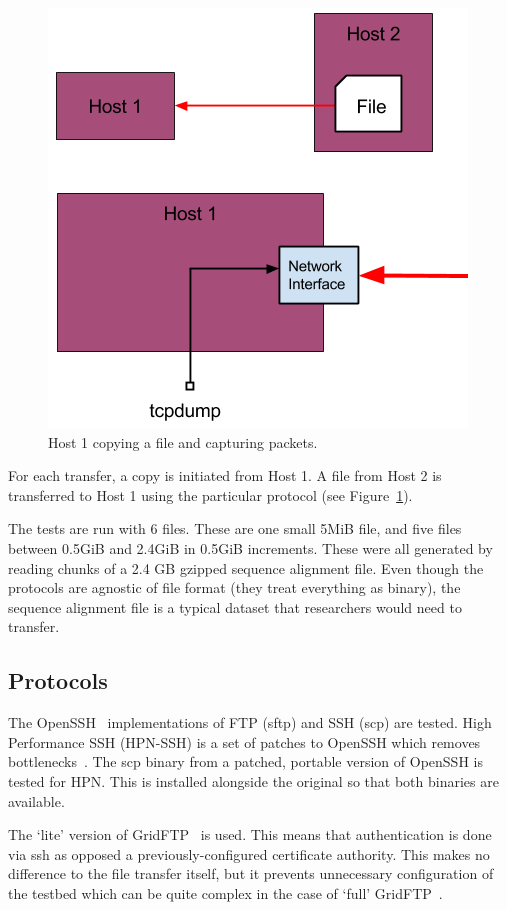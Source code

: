 \documentclass{sig-alternate-05-2015}
\begin{document}
\begin{figure}[t]
\centering
	\includegraphics[width=.6\linewidth]{img/transfer_example.png}
\caption{Host 1 copying a file and capturing packets.\label{fig:copy_example}}
\end{figure}
For each transfer, a copy is initiated from Host 1. A file from Host 2 is transferred to Host 1 using the particular protocol (see Figure~\ref{fig:copy_example}).

The tests are run with 6 files. These are one small 5MiB file, and five files between 0.5GiB and 2.4GiB in 0.5GiB increments. These were all generated by reading chunks of a 2.4 GB gzipped sequence alignment file. Even though the protocols are agnostic of file format (they treat everything as binary), the sequence alignment file is a typical dataset that researchers would need to transfer.

\subsection{Protocols}
The OpenSSH~\cite{openssh} implementations of FTP (sftp) and SSH (scp) are tested. High Performance SSH (HPN-SSH) is a set of patches to OpenSSH which removes bottlenecks~\cite{rapier2008high}. The scp binary from a patched, portable version of OpenSSH is tested for HPN\@. This is installed alongside the original so that both binaries are available.

The `lite' version of GridFTP~\cite{allcock2005globus} is used. This means that authentication is done via ssh as opposed a previously-configured certificate authority. This makes no difference to the file transfer itself, but it prevents unnecessary configuration of the testbed which can be quite complex in the case of `full' GridFTP~\cite{gridftplite}.
\end{document}
